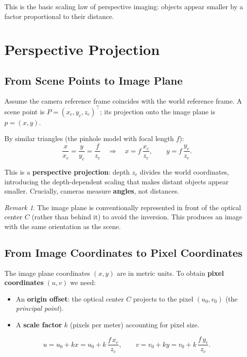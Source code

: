 \documentclass[11pt,a4paper]{article}
\theoremstyle{definition}
\theoremstyle{plain}
\theoremstyle{remark}
\newtheorem*{remark}{Remark}
\begin{document}
This is the basic scaling law of perspective imaging: objects appear smaller by a factor proportional to their distance.

\section{Perspective Projection}

\subsection{From Scene Points to Image Plane}

Assume the camera reference frame coincides with the world reference frame. A scene point is $P = (x_c, y_c, z_c)^\top$; its projection onto the image plane is $p = (x, y)$.

By similar triangles (the pinhole model with focal length $f$):
\[
\frac{x}{x_c} = \frac{y}{y_c} = \frac{f}{z_c}
\quad \Longrightarrow \quad
x = f\,\frac{x_c}{z_c}, \qquad y = f\,\frac{y_c}{z_c}.
\]

This is a \textbf{perspective projection}: depth $z_c$ divides the world coordinates, introducing the depth-dependent scaling that makes distant objects appear smaller. Crucially, cameras measure \textbf{angles}, not distances.

\begin{remark}
The image plane is conventionally represented in front of the optical center $C$ (rather than behind it) to avoid the inversion. This produces an image with the same orientation as the scene.
\end{remark}

\subsection{From Image Coordinates to Pixel Coordinates}

The image plane coordinates $(x, y)$ are in metric units. To obtain \textbf{pixel coordinates} $(u, v)$ we need:

\begin{itemize}
    \item An \textbf{origin offset}: the optical center $C$ projects to the pixel $(u_0, v_0)$ (the \textit{principal point}).
    \item A \textbf{scale factor} $k$ (pixels per meter) accounting for pixel size.
\end{itemize}

\[
u = u_0 + kx = u_0 + k\,\frac{f\,x_c}{z_c}, \qquad v = v_0 + ky = v_0 + k\,\frac{f\,y_c}{z_c}.
\]
\end{document}
